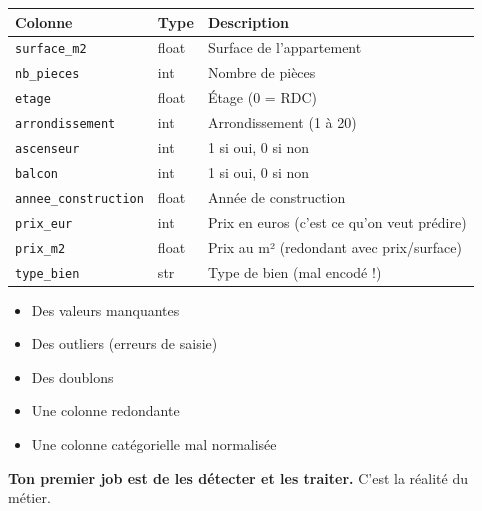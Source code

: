\documentclass[
  french,
  11pt,
  a4paper,
]{scrbook}
\newcounter{none} %
\providecommand{\tightlist}{%
  \setlength{\itemsep}{0pt}\setlength{\parskip}{0pt}}
\begin{document}
{\def\LTcaptype{none} %
\begin{longtable}[]{@{}lll@{}}
\toprule\noalign{}
Colonne & Type & Description \\
\midrule\noalign{}
\endhead
\bottomrule\noalign{}
\endlastfoot
\texttt{surface\_m2} & float & Surface de l'appartement \\
\texttt{nb\_pieces} & int & Nombre de pièces \\
\texttt{etage} & float & Étage (0 = RDC) \\
\texttt{arrondissement} & int & Arrondissement (1 à 20) \\
\texttt{ascenseur} & int & 1 si oui, 0 si non \\
\texttt{balcon} & int & 1 si oui, 0 si non \\
\texttt{annee\_construction} & float & Année de construction \\
\texttt{prix\_eur} & int & Prix en euros (c'est ce qu'on veut
prédire) \\
\texttt{prix\_m2} & float & Prix au m² (redondant avec prix/surface) \\
\texttt{type\_bien} & str & Type de bien (mal encodé !) \\
\end{longtable}
}

\begin{tcolorbox}[enhanced jigsaw, arc=.35mm, bottomrule=.15mm, bottomtitle=1mm, breakable, colback=white, colbacktitle=quarto-callout-warning-color!10!white, colframe=quarto-callout-warning-color-frame, coltitle=black, left=2mm, leftrule=.75mm, opacityback=0, opacitybacktitle=0.6, rightrule=.15mm, title=\textcolor{quarto-callout-warning-color}{\faExclamationTriangle}\hspace{0.5em}{⚠️ Le fichier contient délibérément des défauts}, titlerule=0mm, toprule=.15mm, toptitle=1mm]

\begin{itemize}
\tightlist
\item
  Des valeurs manquantes
\item
  Des outliers (erreurs de saisie)
\item
  Des doublons
\item
  Une colonne redondante
\item
  Une colonne catégorielle mal normalisée
\end{itemize}

\textbf{Ton premier job est de les détecter et les traiter.} C'est la
réalité du métier.

\end{tcolorbox}
\end{document}
